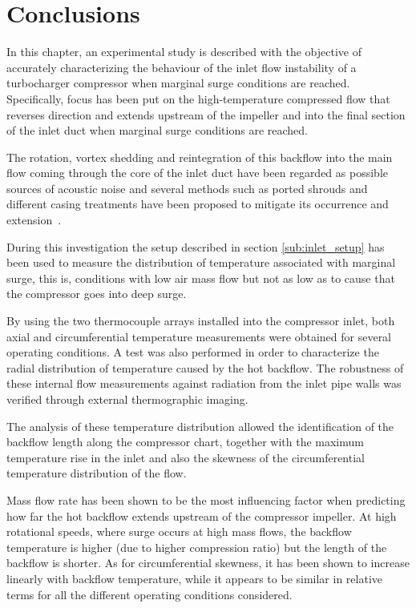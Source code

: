 \section{Conclusions}

In this chapter, an experimental study is described with the objective of accurately characterizing the behaviour of the inlet flow instability of a turbocharger compressor when marginal surge conditions are reached. Specifically, focus has been put on the high-temperature compressed flow that reverses direction and extends upstream of the impeller and into the final section of the inlet duct when marginal surge conditions are reached.

The rotation, vortex shedding and reintegration of this backflow into the main flow coming through the core of the inlet duct have been regarded as possible sources of acoustic noise and several methods such as ported shrouds and different casing treatments have been proposed to mitigate its occurrence and extension~\cite{chen2012casing,ding2013experimental}.

During this investigation the setup described in section \ref{sub:inlet_setup} has been used to measure the distribution of temperature associated with marginal surge, this is, conditions with low air mass flow but not as low as to cause that the compressor goes into deep surge.

By using the two thermocouple arrays installed into the compressor inlet, both axial and circumferential temperature measurements were obtained for several operating conditions. A test was also performed in order to characterize the radial distribution of temperature caused by the hot backflow. The robustness of these internal flow measurements against radiation from the inlet pipe walls was verified through external thermographic imaging.

The analysis of these temperature distribution allowed the identification of the backflow length along the compressor chart, together with the maximum temperature rise in the inlet and also the skewness of the circumferential temperature distribution of the flow.

Mass flow rate has been shown to be the most influencing factor when predicting how far the hot backflow extends upstream of the compressor impeller. At high rotational speeds, where surge occurs at high mass flows, the backflow temperature is higher (due to higher compression ratio) but the length of the backflow is shorter. As for circumferential skewness, it has been shown to increase linearly with backflow temperature, while it appears to be similar in relative terms for all the different operating conditions considered.

